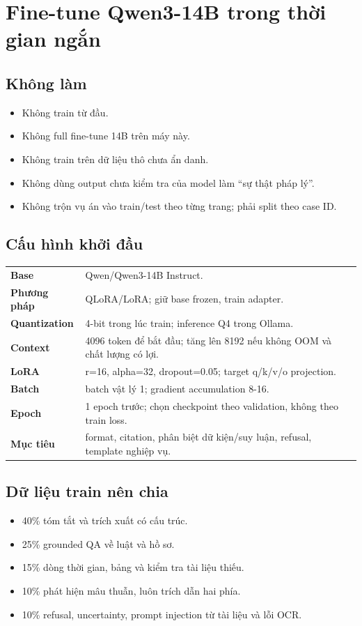 \documentclass[11pt,a4paper]{article}
\begin{document}
\section{Fine-tune Qwen3-14B trong thời gian ngắn}

\subsection{Không làm}

\begin{itemize}
  \item Không train từ đầu.
  \item Không full fine-tune 14B trên máy này.
  \item Không train trên dữ liệu thô chưa ẩn danh.
  \item Không dùng output chưa kiểm tra của model làm “sự thật pháp lý”.
  \item Không trộn vụ án vào train/test theo từng trang; phải split theo case ID.
\end{itemize}

\subsection{Cấu hình khởi đầu}

\begin{tabularx}{\linewidth}{@{}>{\bfseries}p{4.3cm}X@{}}
Base & Qwen/Qwen3-14B Instruct.\\
Phương pháp & QLoRA/LoRA; giữ base frozen, train adapter.\\
Quantization & 4-bit trong lúc train; inference Q4 trong Ollama.\\
Context & 4096 token để bắt đầu; tăng lên 8192 nếu không OOM và chất lượng có lợi.\\
LoRA & r=16, alpha=32, dropout=0.05; target q/k/v/o projection.\\
Batch & batch vật lý 1; gradient accumulation 8-16.\\
Epoch & 1 epoch trước; chọn checkpoint theo validation, không theo train loss.\\
Mục tiêu & format, citation, phân biệt dữ kiện/suy luận, refusal, template nghiệp vụ.
\end{tabularx}

\subsection{Dữ liệu train nên chia}

\begin{itemize}
  \item 40\% tóm tắt và trích xuất có cấu trúc.
  \item 25\% grounded QA về luật và hồ sơ.
  \item 15\% dòng thời gian, bảng và kiểm tra tài liệu thiếu.
  \item 10\% phát hiện mâu thuẫn, luôn trích dẫn hai phía.
  \item 10\% refusal, uncertainty, prompt injection từ tài liệu và lỗi OCR.
\end{itemize}
\end{document}
